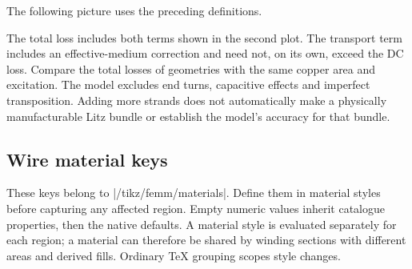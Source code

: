 The following picture uses the preceding definitions.


\begin{codeexample}[width=5.2cm]
\end{codeexample}


\begin{codeexample}[width=5.2cm]
\end{codeexample}


The total loss includes both terms shown in the second plot. The transport term
includes an effective-medium correction and need not, on its own, exceed the DC
loss. Compare the total losses of geometries with the same copper area and
excitation. The model excludes end turns, capacitive effects and imperfect
transposition. Adding more strands does not automatically make a physically
manufacturable Litz bundle or establish the model's accuracy for that bundle.

\subsection{Wire material keys}
\label{sec:wire-keys}
These keys belong to |/tikz/femm/materials|. Define them in material styles
before capturing any affected region. Empty numeric values inherit catalogue
properties, then the native defaults. A material style is evaluated separately
for each region; a material can therefore be shared by winding sections with
different areas and derived fills. Ordinary TeX grouping scopes style changes.

